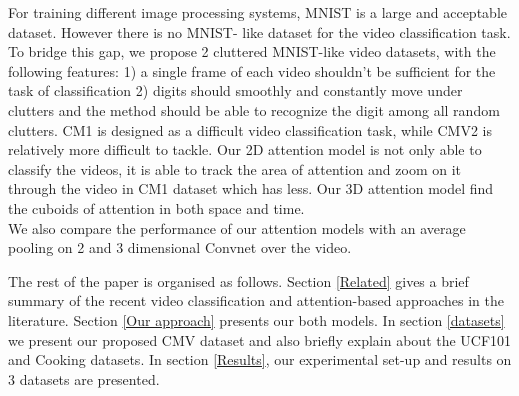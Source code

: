 \documentclass{article} %
\begin{document}
For training different image processing systems, MNIST is a large and acceptable dataset. However there is no MNIST- like dataset for the video classification task. To bridge this gap, we propose 2 cluttered MNIST-like video datasets, with the following features: 1) a single frame of each video shouldn't be sufficient for the task of classification 2) digits should smoothly and constantly move under clutters and the method should be able to recognize the digit among all random clutters. CM1 is designed as a difficult video classification task, while CMV2 is relatively more difficult to tackle. Our 2D attention model is not only able to classify the videos, it is able to track the area of attention and zoom on it through the video in CM1 dataset which has less. Our 3D attention model find the cuboids of attention in both space and time. \\
We also compare the performance of our attention models with an average pooling on 2 and 3 dimensional Convnet over the video.

The rest of the paper is organised as follows.
Section \ref{Related} gives a brief summary of the recent video classification and attention-based approaches in the literature. 
Section \ref{Our approach} presents our both models. In section \ref{datasets} we present our proposed CMV dataset and also briefly explain about the UCF101 and Cooking datasets. In section \ref{Results}, our experimental set-up and results on 3 datasets are presented.
\end{document}
